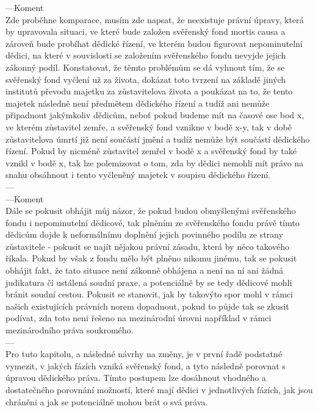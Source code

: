 \documentclass{article}
\begin{document}

---Koment\\
Zde proběhne komparace, musím zde napsat, že neexistuje právní úpravy, která by upravovala situaci, ve které bude založen svěřenský fond mortis causa a zároveň bude probíhat dědické řízení, ve kterém budou figurovat nepominutelní dědici, na které v souvislosti se založením svěřenského fondu nevyjde jejich zákonný podíl. Konstatovat, že těmto problémům se dá vyhnout tím, že se svěřenský fond vyčlení už za života, dokázat toto tvrzení na základě jiných institutů převodu majetku za zůstavitelova života a poukázat na to, že tento majetek následně není předmětem dědického řízení a tudíž ani nemůže připadnout jakýmkoliv dědicům, neboť pokud budeme mít na časové ose bod x, ve kterém zůstavitel zemře, a svěřenský fond vznikne v bodě x-y, tak v době zůstavitelova úmrtí již není součástí jmění a tudíž nemůže být součástí dědického řízení. Pokud by nicméně zůstavitel zemřel v bodě x a svěřenský fond by také vznikl v bodě x, tak lze polemizovat o tom, zda by dědici nemohli mít právo na snahu obsáhnout i tento vyčleněný majetek v soupisu dědického řízení.\\
---\\

---Koment\\
Dále se pokusit obhájit můj názor, že pokud budou obmyšlenými svěřenského fondu i nepominutelní dědicové, tak plněním ze svěřenského fondu právě tímto dědicům dojde k neformálnímu doplnění jejich povinného podílu ze strany zůstavitele - pokusit se najít nějakou právní zásadu, která by něco takového říkala. Pokud by však z fondu mělo být plněno nikomu jinému, tak se pokusit obhájit fakt, že tato situace není zákonně obhájena a není na ní ani žádná judikatura či ustálená soudní praxe, a potenciálně by se tedy dědicové mohli bránit soudní cestou. Pokusit se stanovit, jak by takovýto spor mohl v rámci našich existujících právních norem dopadnout, pokud to půjde tak se zkusit podívat, zda toto neni řešeno na mezinárodní úrovni například v rámci mezinárodního práva soukromého. \\
---\\

Pro tuto kapitolu, a následné návrhy na změny, je v první řadě podstatné vymezit,  v jakých fázích vzniká svěřenský fond, a tyto následně porovnat s úpravou dědického práva. Tímto postupem lze dosáhnout vhodného a dostatečného porovnání možností, které mají dědici v jednotlivých fázích, jak jsou chráněni a jak se potenciálně mohou brát o svá práva. \\ 
\end{document}
